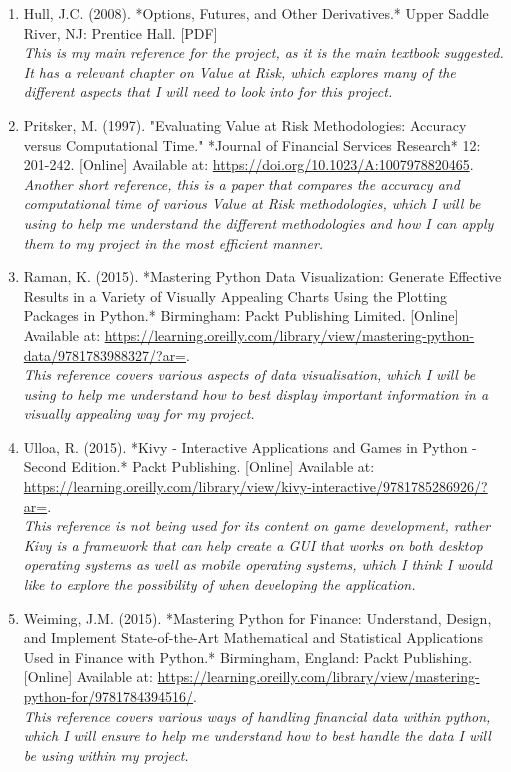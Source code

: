 \documentclass{article}
\begin{document}
\begin{small}
\begin{enumerate}
  \item\label{ref6} Hull, J.C. (2008). *Options, Futures, and Other Derivatives.* Upper Saddle River, NJ: Prentice Hall. [PDF]
  \\\textit{This is my main reference for the project, as it is the main textbook suggested. It has a relevant chapter on Value at Risk, which explores many of the different aspects that I will need to look into for this project.}

  \item\label{ref7} Pritsker, M. (1997). "Evaluating Value at Risk Methodologies: Accuracy versus Computational Time." *Journal of Financial Services Research* 12: 201-242. [Online] Available at: \url{https://doi.org/10.1023/A:1007978820465}.
  \\\textit{Another short reference, this is a paper that compares the accuracy and computational time of various Value at Risk methodologies, which I will be using to help me understand the different methodologies and how I can apply them to my project in the most efficient manner.}

  \item\label{ref8} Raman, K. (2015). *Mastering Python Data Visualization: Generate Effective Results in a Variety of Visually Appealing Charts Using the Plotting Packages in Python.* Birmingham: Packt Publishing Limited. [Online] Available at: \url{https://learning.oreilly.com/library/view/mastering-python-data/9781783988327/?ar=}.
  \\\textit{This reference covers various aspects of data visualisation, which I will be using to help me understand how to best display important information in a visually appealing way for my project.}

  \item\label{ref9} Ulloa, R. (2015). *Kivy - Interactive Applications and Games in Python - Second Edition.* Packt Publishing. [Online] Available at: \url{https://learning.oreilly.com/library/view/kivy-interactive/9781785286926/?ar=}.
  \\\textit{This reference is not being used for its content on game development, rather Kivy is a framework that can help create a GUI that works on both desktop operating systems as well as mobile operating systems, which I think I would like to explore the possibility of when developing the application.}

  \item\label{ref10} Weiming, J.M. (2015). *Mastering Python for Finance: Understand, Design, and Implement State-of-the-Art Mathematical and Statistical Applications Used in Finance with Python.* Birmingham, England: Packt Publishing. [Online] Available at: \url{https://learning.oreilly.com/library/view/mastering-python-for/9781784394516/}.
  \\\textit{This reference covers various ways of handling financial data within python, which I will ensure to help me understand how to best handle the data I will be using within my project.}


\end{enumerate}
\end{small}
\end{document}
